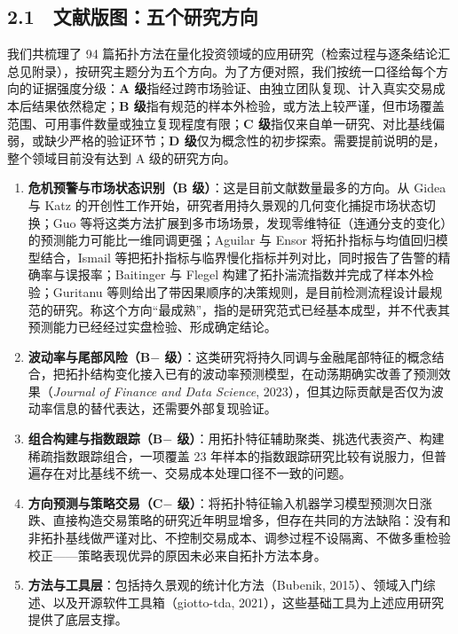 \documentclass[12pt,a4paper]{ctexart}
\begin{document}
\subsection{2.1　文献版图：五个研究方向}
我们共梳理了 94 篇拓扑方法在量化投资领域的应用研究（检索过程与逐条结论汇总见附录），按研究主题分为五个方向。为了方便对照，我们按统一口径给每个方向的证据强度分级：\textbf{A 级}指经过跨市场验证、由独立团队复现、计入真实交易成本后结果依然稳定；\textbf{B 级}指有规范的样本外检验，或方法上较严谨，但市场覆盖范围、可用事件数量或独立复现程度有限；\textbf{C 级}指仅来自单一研究、对比基线偏弱，或缺少严格的验证环节；\textbf{D 级}仅为概念性的初步探索。需要提前说明的是，整个领域目前没有达到 A 级的研究方向。\par
\begin{enumerate}
\item \textbf{危机预警与市场状态识别（B 级）}：这是目前文献数量最多的方向。从 Gidea 与 Katz 的开创性工作开始，研究者用持久景观的几何变化捕捉市场状态切换；Guo 等将这类方法扩展到多市场场景，发现零维特征（连通分支的变化）的预测能力可能比一维同调更强；Aguilar 与 Ensor 将拓扑指标与均值回归模型结合，Ismail 等把拓扑指标与临界慢化指标并列对比，同时报告了告警的精确率与误报率；Baitinger 与 Flegel 构建了拓扑湍流指数并完成了样本外检验；Guritanu 等则给出了带因果顺序的决策规则，是目前检测流程设计最规范的研究。称这个方向“最成熟”，指的是研究范式已经基本成型，并不代表其预测能力已经经过实盘检验、形成确定结论。
\item \textbf{波动率与尾部风险（B\(-\) 级）}：这类研究将持久同调与金融尾部特征的概念结合，把拓扑结构变化接入已有的波动率预测模型，在动荡期确实改善了预测效果（\textit{Journal of Finance and Data Science}, 2023），但其边际贡献是否仅为波动率信息的替代表达，还需要外部复现验证。
\item \textbf{组合构建与指数跟踪（B\(-\) 级）}：用拓扑特征辅助聚类、挑选代表资产、构建稀疏指数跟踪组合，一项覆盖 23 年样本的指数跟踪研究比较有说服力，但普遍存在对比基线不统一、交易成本处理口径不一致的问题。
\item \textbf{方向预测与策略交易（C\(-\) 级）}：将拓扑特征输入机器学习模型预测次日涨跌、直接构造交易策略的研究近年明显增多，但存在共同的方法缺陷：没有和非拓扑基线做严谨对比、不控制交易成本、调参过程不设隔离、不做多重检验校正——策略表现优异的原因未必来自拓扑方法本身。
\item \textbf{方法与工具层}：包括持久景观的统计化方法（Bubenik, 2015）、领域入门综述、以及开源软件工具箱（giotto-tda, 2021），这些基础工具为上述应用研究提供了底层支撑。
\end{enumerate}
\end{document}
